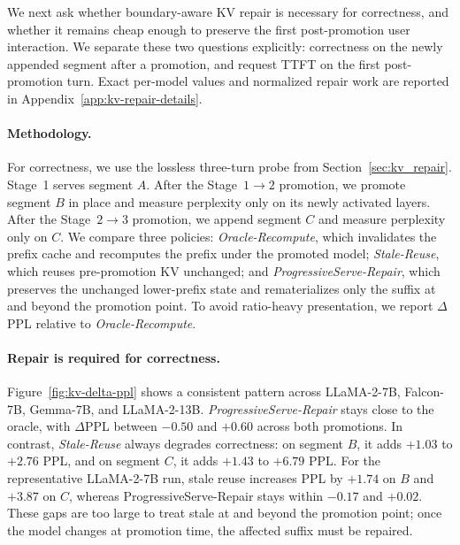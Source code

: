 \documentclass[sigplan,anonymous,review,nonacm]{acmart}
\begin{document}
We next ask whether boundary-aware KV repair is necessary for correctness, and whether it remains cheap enough to preserve the first post-promotion user interaction. We separate these two questions explicitly: correctness on the newly appended segment after a promotion, and request TTFT on the first post-promotion turn. Exact per-model values and normalized repair work are reported in Appendix~\ref{app:kv-repair-details}.

\paragraph{Methodology.}
For correctness, we use the lossless three-turn probe from Section~\ref{sec:kv_repair}. Stage~1 serves segment \(A\). After the Stage~\(1\!\rightarrow\!2\) promotion, we promote segment \(B\) in place and measure perplexity only on its newly activated layers. After the Stage~\(2\!\rightarrow\!3\) promotion, we append segment \(C\) and measure perplexity only on \(C\). We compare three policies: \textit{Oracle-Recompute}, which invalidates the prefix cache and recomputes the prefix under the promoted model; \textit{Stale-Reuse}, which reuses pre-promotion KV unchanged; and \textit{ProgressiveServe-Repair}, which preserves the unchanged lower-prefix state and rematerializes only the suffix at and beyond the promotion point. To avoid ratio-heavy presentation, we report \(\Delta\)PPL relative to \textit{Oracle-Recompute}.

\paragraph{Repair is required for correctness.}
Figure~\ref{fig:kv-delta-ppl} shows a consistent pattern across LLaMA-2-7B, Falcon-7B, Gemma-7B, and LLaMA-2-13B. \textit{ProgressiveServe-Repair} stays close to the oracle, with \(\Delta\)PPL between \(-0.50\) and \(+0.60\) across both promotions. In contrast, \textit{Stale-Reuse} always degrades correctness: on segment \(B\), it adds \(+1.03\) to \(+2.76\) PPL, and on segment \(C\), it adds \(+1.43\) to \(+6.79\) PPL. For the representative LLaMA-2-7B run, stale reuse increases PPL by \(+1.74\) on \(B\) and \(+3.87\) on \(C\), whereas ProgressiveServe-Repair stays within \(-0.17\) and \(+0.02\). These gaps are too large to treat stale at and beyond the promotion point; once the model changes at promotion time, the affected suffix must be repaired.
\end{document}

